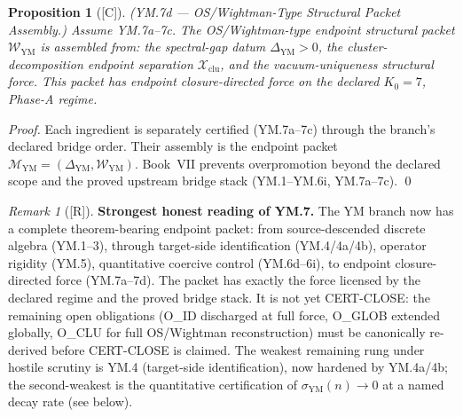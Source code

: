 \documentclass[12pt,oneside]{amsbook}
\theoremstyle{plain}
\newtheorem{proposition}[theorem]{Proposition}
\theoremstyle{definition}
\theoremstyle{remark}
\newtheorem{remark}[theorem]{Remark}
\newcommand{\status}[1]{\textup{[#1]}}
\begin{document}
\begin{proposition}[\status{C}]\label{prop:YM7d}
\textup{(YM.7d --- OS/Wightman-Type Structural Packet Assembly.)}
Assume YM.7a--7c. The OS/Wightman-type endpoint structural packet
$\mathcal{W}_{\mathrm{YM}}$ is assembled from: the spectral-gap datum
$\Delta_{\mathrm{YM}} > 0$, the cluster-decomposition endpoint
separation $\mathcal{X}_{\mathrm{clu}}$, and the vacuum-uniqueness
structural force. This packet has endpoint closure-directed force on
the declared $K_0=7$, Phase-A regime.
\end{proposition}

\begin{proof}
Each ingredient is separately certified (YM.7a--7c) through the
branch's declared bridge order. Their assembly is the endpoint
packet $\mathcal{M}_{\mathrm{YM}} = (\Delta_{\mathrm{YM}},
\mathcal{W}_{\mathrm{YM}})$. Book~VII prevents overpromotion beyond
the declared scope and the proved upstream bridge stack
(YM.1--YM.6i, YM.7a--7c). \qed
\end{proof}

\begin{remark}[\status{R}]\label{rem:YM7-honest-reading}
\textbf{Strongest honest reading of YM.7.}
The YM branch now has a complete theorem-bearing endpoint packet:
from source-descended discrete algebra (YM.1--3), through
target-side identification (YM.4/4a/4b), operator rigidity
(YM.5), quantitative coercive control (YM.6d--6i), to endpoint
closure-directed force (YM.7a--7d). The packet has
exactly the force licensed by the declared regime and the proved
bridge stack. It is not yet CERT-CLOSE: the remaining open
obligations (O\_ID discharged at full force, O\_GLOB extended
globally, O\_CLU for full OS/Wightman reconstruction) must be
canonically re-derived before CERT-CLOSE is claimed. The weakest
remaining rung under hostile scrutiny is YM.4 (target-side
identification), now hardened by YM.4a/4b; the second-weakest is
the quantitative certification of $\sigma_{\mathrm{YM}}(n) \to 0$
at a named decay rate (see below).
\end{remark}



\end{document}
